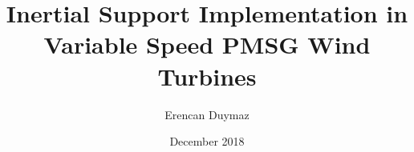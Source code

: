 \documentclass[chaparabic,ee,ms,12pt,oneandhalf]{metu}
\author{Erencan Duymaz}
\title{Inertial Support Implementation in Variable Speed PMSG Wind Turbines}
\date{December 2018}
\begin{document}
\begin{preliminaries}


\end{preliminaries}
%   
% 
%

\setlength{\parindent}{0em}
\setlength{\parskip}{10pt}









%
%

%

\appendix

\end{document}
